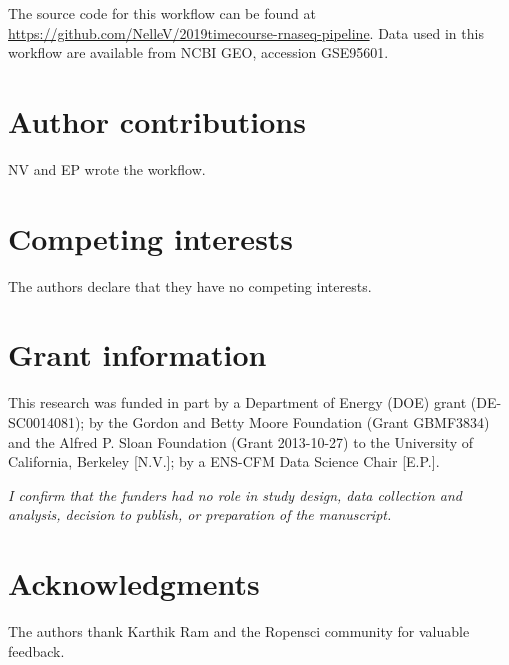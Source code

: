 \documentclass[9pt,a4paper,]{extarticle}
\begin{document}
The source code for this workflow can be found at \url{https://github.com/NelleV/2019timecourse-rnaseq-pipeline}.
Data used in this workflow are available from NCBI GEO, accession GSE95601.

\hypertarget{author-contributions}{%
\section{Author contributions}\label{author-contributions}}

NV and EP wrote the workflow.

\hypertarget{competing-interests}{%
\section{Competing interests}\label{competing-interests}}

The authors declare that they have no competing interests.

\hypertarget{grant-information}{%
\section{Grant information}\label{grant-information}}

This research was funded in part by a Department of Energy (DOE) grant
(DE-SC0014081); by the Gordon and Betty Moore Foundation (Grant GBMF3834) and
the Alfred P. Sloan Foundation (Grant 2013-10-27) to the University of
California, Berkeley {[}N.V.{]}; by a ENS-CFM Data Science Chair {[}E.P.{]}.

\emph{I confirm that the funders had no role in study design, data collection and
analysis, decision to publish, or preparation of the manuscript.}

\hypertarget{acknowledgments}{%
\section{Acknowledgments}\label{acknowledgments}}

The authors thank Karthik Ram and the Ropensci community for valuable
feedback.

\renewcommand\refname{References}
{\small}
\end{document}
